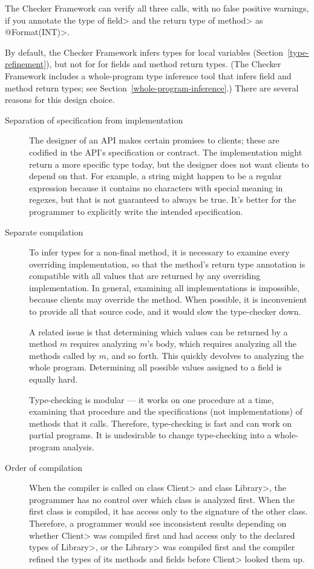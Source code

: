 The Checker Framework can verify all three calls, with no false positive
warnings, if you annotate the type of \<field> and the return type of
\<method> as \<@Format(INT)>.

By default, the Checker Framework infers types for local variables
(Section~\ref{type-refinement}), but not for for fields and method return
types.  (The Checker Framework includes a whole-program type inference tool
that infers field and method return types; see
Section~\ref{whole-program-inference}.)
There are several reasons for this design choice.

\begin{description}
\item[Separation of specification from implementation]
  The designer of an API makes certain promises to clients; these are
  codified in the API's specification or contract.  The implementation
  might return a more specific type today, but the designer does not want
  clients to depend on that.  For example, a string might happen to be a
  regular expression because it contains no characters with special meaning
  in regexes, but that is not guaranteed to always be true.  It's better
  for the programmer to explicitly write the intended specification.

\item[Separate compilation]
  To infer types for a non-final method, it is necessary to examine every
  overriding implementation, so that the method's return type annotation is
  compatible with all values that are returned by any overriding
  implementation.  In general, examining all implementations is impossible,
  because clients may override the method.  When possible, it is
  inconvenient to provide all that source code, and it would slow the
  type-checker down.

  A related issue is that determining which values can be returned by a
  method $m$ requires analyzing $m$'s body, which requires analyzing
  all the methods called by $m$, and so forth.  This quickly devolves to
  analyzing the whole program.
  Determining all possible values assigned to a field is equally hard.

  Type-checking is modular --- it works on one procedure at a time,
  examining that procedure and the specifications (not implementations) of
  methods that it calls.  Therefore, type-checking is fast and can work on
  partial programs.  It is undesirable to change type-checking into a
  whole-program analysis.

\item[Order of compilation]
  When the compiler is called on class \<Client> and class \<Library>, the
  programmer has no control over which class is analyzed first.  When the
  first class is compiled, it has access only to the signature of the other
  class.  Therefore, a programmer would see inconsistent results depending
  on whether \<Client> was compiled first and had access only to the
  declared types of \<Library>, or the \<Library> was compiled first and
  the compiler refined the types of its methods and fields before \<Client>
  looked them up.


\end{description}
